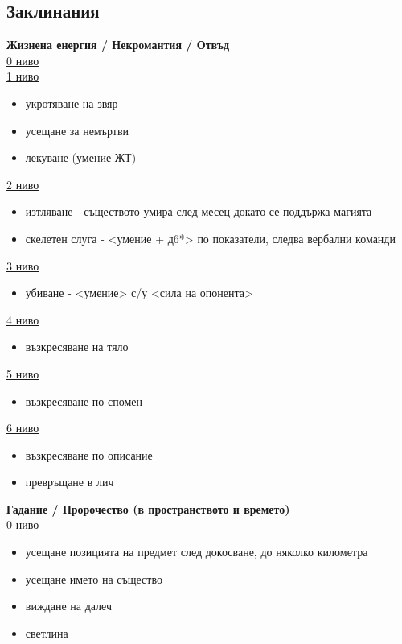 \subsection{Заклинания} 

\textbf{Жизнена енергия / Некромантия / Отвъд}  \\ 
\underline{0 ниво} \\
\underline{1 ниво} \\
\begin{itemize}
  \item{укротяване на звяр}
  \item{усещане за немъртви}
  \item{лекуване (умение ЖТ)}
\end{itemize}

\underline{2 ниво}
\begin{itemize}
  \item{изтляване - съществото умира след месец  докато се поддържа магията}
  \item{скелетен слуга - <умение + д6*> по показатели, следва вербални команди}
\end{itemize}

\underline{3 ниво}
\begin{itemize}
\item{убиване - <умение> с/у <сила на опонента>}
\end{itemize}

\underline{4 ниво}
\begin{itemize}
\item{възкресяване на тяло}
\end{itemize}

\underline{5 ниво}
\begin{itemize}
\item{възкресяване по спомен}
\end{itemize}

\underline{6 ниво}
\begin{itemize}
\item{възкресяване по описание}
\item{превръщане в лич}
\end{itemize}

\vspace{1cm}
\textbf{Гадание / Пророчество (в пространството и времето)}  \\
\underline{0 ниво}  \\
\begin{itemize}
  \item{усещане позицията на предмет след докосване, до няколко километра}
  \item{усещане името на същество}
  \item{виждане на далеч}
  \item{светлина}
\end{itemize}

